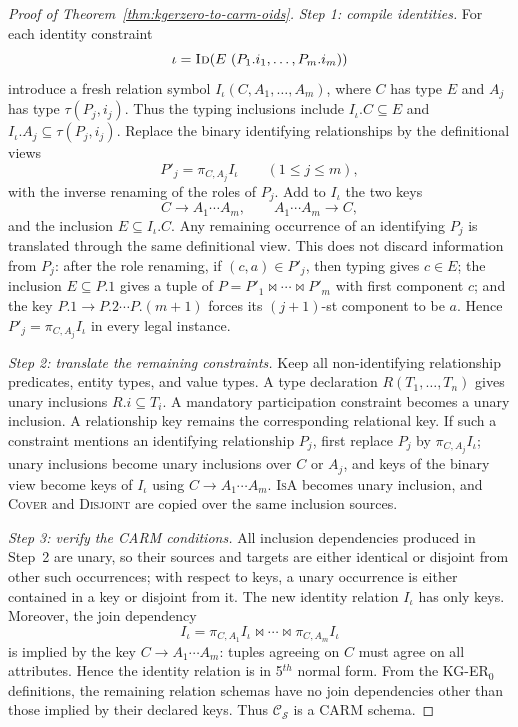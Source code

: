 \documentclass[10pt]{article}
\begin{document}
\begin{proof}[Proof of Theorem~\ref{thm:kgerzero-to-carm-oids}]
\emph{Step 1: compile identities.}
For each identity constraint
\[
  \iota=\textsc{Id}(E\ (P_1.i_1,\ldots,P_m.i_m))   
\]
introduce a fresh relation symbol
$I_\iota(C,A_1,\ldots,A_m)$, where $C$ has type $E$ and
$A_j$ has type $\tau(P_j,i_j)$.  Thus the typing inclusions include
$I_\iota.C\subseteq E$ and
$I_\iota.A_j\subseteq\tau(P_j,i_j)$.  Replace the binary identifying
relationships by the definitional views
\[
  P'_j=\pi_{C,A_j} I_\iota \qquad (1\leq j\leq m),
\]
with the inverse renaming of the roles of $P_j$.  Add to $I_\iota$ the two
keys
\[
  C\to A_1\cdots A_m,
  \qquad
  A_1\cdots A_m\to C,
\]
and the inclusion $E\subseteq I_\iota.C$.  Any remaining occurrence of an
identifying $P_j$ is translated through the same definitional view.
This does not discard information from $P_j$: after the role renaming,
if $(c,a)\in P'_j$, then typing gives $c\in E$; the inclusion
$E\subseteq P.1$ gives a tuple of
$P=P'_1\bowtie\cdots\bowtie P'_m$ with first component $c$; and the key
$P.1\to P.2\cdots P.(m+1)$ forces its $(j+1)$-st component to be $a$.
Hence $P'_j=\pi_{C,A_j}I_\iota$ in every legal instance.

\emph{Step 2: translate the remaining constraints.}
Keep all non-identifying relationship predicates, entity types, and
value types.  A type declaration $R(T_1,\ldots,T_n)$ gives unary
inclusions $R.i\subseteq T_i$.  A mandatory participation constraint
becomes a unary inclusion.  A relationship key remains the corresponding
relational key.  If such a constraint mentions an identifying
relationship $P_j$, first replace $P_j$ by
$\pi_{C,A_j}I_\iota$; unary inclusions become unary inclusions over
$C$ or $A_j$, and keys of the binary view become keys of $I_\iota$
using $C\to A_1\cdots A_m$.  \textsc{IsA} becomes unary inclusion, and
\textsc{Cover} and \textsc{Disjoint} are copied over the same inclusion
sources.

\emph{Step 3: verify the \textsf{CARM} conditions.}
All inclusion dependencies produced in Step~2 are unary, so their sources
and targets are either identical or disjoint from other such occurrences;
with respect to keys, a unary occurrence is either contained in a key or
disjoint from it.  The new identity relation $I_\iota$ has only keys.  
Moreover, the join dependency
\[
  I_\iota=\pi_{C,A_1}I_\iota\bowtie\cdots\bowtie\pi_{C,A_m}I_\iota
\]
is implied by the key $C\to A_1\cdots A_m$: tuples agreeing on $C$ must
agree on all attributes.  Hence the identity relation is in 5$^{th}$
normal form.  From the KG-ER$_0$ definitions, the remaining relation
schemas have no join dependencies other than those implied by their
declared keys.  Thus
$\mathcal C_{\mathcal S}$ is a \textsf{CARM} schema.


\end{proof}
\end{document}

